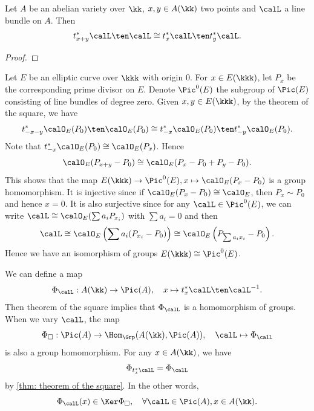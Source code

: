     \begin{theorem}\label{thm: theorem of the square}
        Let \(A\) be an abelian variety over \(\kk\), \(x,y \in A(\kk)\) two points and \(\calL\) a line bundle on \(A\).
        Then 
        \[ t_{x+y}^*\calL \ten \calL \cong t_x^*\calL \ten t_y^*\calL. \]
    \end{theorem}
    \begin{proof}
    \end{proof}

    \begin{example}\label{eg:isomorphism_of_Pic0_of_elliptic_to_itself_by_Theorem_of_square}
        Let \(E\) be an elliptic curve over \(\kkk\) with origin \(0\).
        For \(x \in E(\kkk)\), let \(P_x\) be the corresponding prime divisor on \(E\).
        Denote \(\Pic^0(E)\) the subgroup of \(\Pic(E)\) consisting of line bundles of degree zero.
        Given \(x,y \in E(\kkk)\), by the theorem of the square, we have
        \[ t_{-x-y}^*\calO_E(P_0) \ten \calO_E(P_0) \cong t_{-x}^*\calO_E(P_0) \ten t_{-y}^*\calO_E(P_0). \]
        Note that \(t_{-x}^*\calO_E(P_0) \cong \calO_E(P_{x})\).
        Hence
        \[ \calO_E(P_{x+y} - P_0) \cong \calO_E(P_x - P_0 + P_y - P_0). \]
        This shows that the map \(E(\kkk) \to \Pic^0(E), x \mapsto \calO_E(P_x - P_0)\) is a group homomorphism.
        It is injective since if \(\calO_E(P_x - P_0) \cong \calO_E\), then \(P_x \sim P_0\) and hence \(x = 0\).
        It is also surjective since for any \(\calL \in \Pic^0(E)\), we can write \(\calL \cong \calO_E(\sum a_i P_{x_i})\) with \(\sum a_i = 0\) and then 
        \[ \calL \cong \calO_E\left( \sum a_i (P_{x_i} - P_0) \right) \cong \calO_E\left( P_{\sum a_i x_i} - P_0 \right). \]
        Hence we have an isomorphism of groups \(E(\kkk) \cong \Pic^0(E)\).
    \end{example}

    \begin{remark}\label{rmk: theorem of the square and homomorphism to Picard group}
        We can define a map
        \[ \Phi_\calL: A(\kk) \to \Pic(A), \quad x \mapsto t_x^*\calL \ten \calL^{-1}. \]
        Then theorem of the square implies that \(\Phi_\calL\) is a homomorphism of groups.
        When we vary \(\calL\), the map 
        \[ \Phi_{\square}: \Pic(A) \to \Hom_{\Grp}(A(\kk), \Pic(A)), \quad \calL \mapsto \Phi_\calL \]
        is also a group homomorphism.
        For any \(x \in A(\kk)\), we have
        \[ \Phi_{t_x^*\calL} = \Phi_\calL \]
        by \cref{thm: theorem of the square}.
        In the other words, 
        \[ \Phi_\calL(x) \in \Ker \Phi_{\square}, \quad \forall \calL \in \Pic(A), x \in A(\kk). \]
    \end{remark}


